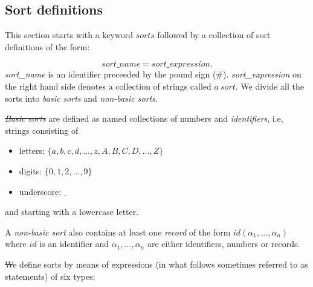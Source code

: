 \documentclass[12pt, letterpaper]{article}
\begin{document}
\subsection{Sort definitions}\label{ss}

This section starts with a keyword $sorts$ followed by a collection of sort definitions of the form:

\begin{equation*}
  sort\_name=sort\_expression.
\end{equation*}
\textit{sort\_name} is an identifier preceeded by the pound sign (\#).
\textit{sort\_expression}  on the right hand side denotes a collection of strings called  $a~sort$. We divide all the sorts into \textit{basic sorts} and \textit{non-basic sorts}. 

\st \textit{Basic sorts} are defined as named collections of numbers and \textit{identifiers}, i.e, strings consisting of
\begin{itemize}
 \item letters: $\{a,b,c,d,...,z,A,B,C,D,...,Z\}$
 \item digits: $\{0,1,2,...,9\}$
 \item underscore: $\_$
\end{itemize}
and starting with a lowercase letter.

A \textit{non-basic sort} also contains at least one \textit{record} of the form $id(\alpha_1,\dots, \alpha_n)$ where $id$ is an identifier and 
$\alpha_1, \dots, \alpha_n$ are either identifiers, numbers or records. 


\st We define sorts by means of expressions (in what follows sometimes referred to as statements) of six types:
\end{document}
